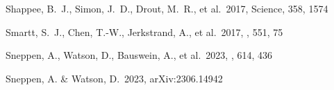 \documentclass[twocolumn,twocolappendix]{aastex63}
\begin{document}
\begin{thebibliography}{}






 Shappee, B.~J., Simon, J.~D., Drout, M.~R., et al.\ 2017, Science, 358, 1574














 Smartt, S.~J., Chen, T.-W., Jerkstrand, A., et al.\ 2017, \nat, 551, 75



 Sneppen, A., Watson, D., Bauswein, A., et al.\ 2023, \nat, 614, 436


 Sneppen, A. \& Watson, D.\ 2023, arXiv:2306.14942







\end{thebibliography}
\end{document}
